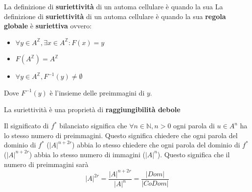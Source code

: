 \begin{definizione} 
    La definizione di \textbf{suriettività} di un automa cellulare è quando la sua
    La definizione di \textbf{suriettività} di un automa cellulare è quando la sua
    \textbf{regola globale} è \textbf{suriettiva} ovvero:
    \begin{itemize}
        \item $\forall y\in A^\mathbb{Z},\exists x\in A^\mathbb{Z}: F(x) = y$
        \item $F(A^\mathbb{Z}) = A^\mathbb{Z}$
        \item $\forall y \in A^\mathbb{Z}, F^{-1}(y) \ne \emptyset $
    \end{itemize}
    Dove $F^{-1}(y)$ è l'insieme delle preimmagini di $y$.
\end{definizione}

La suriettività è una proprietà di \textbf{raggiungibilità debole}

\begin{nota}
    Il significato di $f^{\ast}$ bilanciato significa che $\forall n\in \mathbb{N}, n>0$
    ogni parola di $u\in A^n$ ha lo stesso numero di preimmagini. Questo significa
    chiedere che ogni parola del dominio di $f^{\ast}$ ($|A|^{n+2r}$) abbia lo stesso
    chiedere che ogni parola del dominio di $f^{\ast}$ ($|A|^{n+2r}$) abbia lo stesso
    numero di immagini ($|A|^n$). Questo significa che il numero di preimmagini
    sarà
    \begin{equation*}
        |A|^{2r} = \frac{|A|^{n+2r}}{|A|^n} = \frac{|Dom|}{|CoDom|}
    \end{equation*}
\end{nota}

